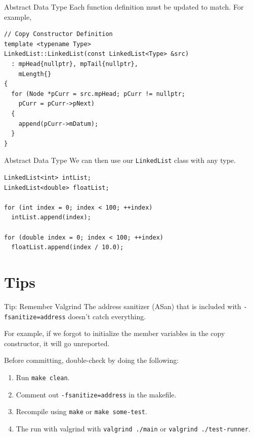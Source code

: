 \documentclass[14pt,aspectratio=1610, hyperref={pdfpagelayout=SinglePage}]{beamer}
\begin{document}
\begin{frame}[fragile]{Abstract Data Type}
Each function definition must be updated to match. For example,

\begin{lstlisting}[basicstyle=\small\ttfamily]
// Copy Constructor Definition
template <typename Type>
LinkedList::LinkedList(const LinkedList<Type> &src)
  : mpHead{nullptr}, mpTail{nullptr},
    mLength{}
{
  for (Node *pCurr = src.mpHead; pCurr != nullptr;
    pCurr = pCurr->pNext)
  {
    append(pCurr->mDatum);
  }
}
\end{lstlisting}
\end{frame}

\begin{frame}[fragile]{Abstract Data Type}
We can then use our \lstinline{LinkedList} class with any type.\\[2em]

\begin{lstlisting}
LinkedList<int> intList;
LinkedList<double> floatList;

for (int index = 0; index < 100; ++index)
  intList.append(index);

for (double index = 0; index < 100; ++index)
  floatList.append(index / 10.0);
\end{lstlisting}
\end{frame}

\section{Tips}
\begin{frame}{Tip: Remember Valgrind}
  The address sanitizer (ASan) that is included with \lstinline{-fsanitize=address} doesn't catch everything.

  For example, if we forgot to initialize the member variables in the copy constructor, it will go unreported.

  Before committing, double-check by doing the following:
  \begin{enumerate}
    \item Run \lstinline{make clean}.
    \item Comment out \lstinline{-fsanitize=address} in the makefile.
    \item Recompile using \lstinline{make} or \lstinline{make some-test}.
    \item The run with valgrind with \lstinline{valgrind ./main} or \lstinline{valgrind ./test-runner}.
  \end{enumerate}
\end{frame}
\end{document}
